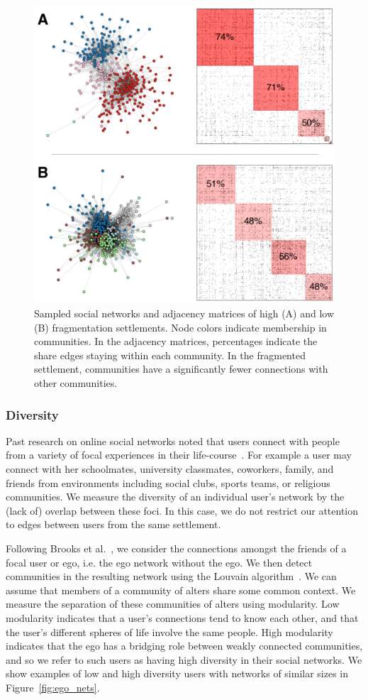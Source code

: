 \begin{figure}
\centering
  \includegraphics[width=.75\textwidth]{images/iwiw/combofrag2.pdf}
  \caption[High and low fragmentation towns.]{Sampled social networks and adjacency matrices of high (A) and low (B) fragmentation settlements. Node colors indicate membership in communities. In the adjacency matrices, percentages indicate the share edges staying within each community. In the fragmented settlement, communities have a significantly fewer connections with other communities.}
  \label{fig:town_nets}
\end{figure}

\subsubsection{Diversity}
Past research on online social networks noted that users connect with people from a variety of focal experiences in their life-course~\cite{brooks2014assessing}. For example a user may connect with her schoolmates, university classmates, coworkers, family, and friends from environments including social clubs, sports teams, or religious communities. We measure the diversity of an individual user's network by the (lack of) overlap between these foci. In this case, we do not restrict our attention to edges between users from the same settlement.

Following Brooks et al.~\cite{brooks2014assessing}, we consider the connections amongst the friends of a focal user or ego, i.e. the ego network without the ego. We then detect communities in the resulting network using the Louvain algorithm~\cite{blondel2008fast}. We can assume that members of a community of alters share some common context. We measure the separation of these communities of alters using modularity. Low modularity indicates that a user's connections tend to know each other, and that the user's different spheres of life involve the same people. High modularity indicates that the ego has a bridging role between weakly connected communities, and so we refer to such users as having high diversity in their social networks. We show examples of low and high diversity users with networks of similar sizes in Figure~\ref{fig:ego_nets}.

